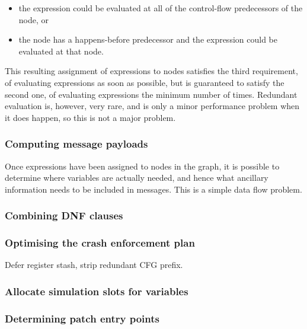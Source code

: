 \documentclass[12pt,a4paper]{book}
\begin{document}
\begin{itemize}
\item the expression could be evaluated at all of the control-flow predecessors of the node, or
\item the node has a happens-before predecessor and the expression could be evaluated at that node.
\end{itemize}

This resulting assignment of expressions to nodes satisfies the third requirement, of evaluating expressions as soon as possible, but is guaranteed to satisfy the second one, of evaluating expressions the minimum number of times.
Redundant evaluation is, however, very rare, and is only a minor performance problem when it does happen, so this is not a major problem.

\subsubsection{Computing message payloads}

Once expressions have been assigned to nodes in the graph, it is possible to determine where variables are actually needed, and hence what ancillary information needs to be included in messages.
This is a simple data flow problem.


\subsubsection{Combining DNF clauses}

\subsubsection{Optimising the crash enforcement plan}
Defer register stash, strip redundant CFG prefix.

\subsubsection{Allocate simulation slots for variables}

\subsubsection{Determining patch entry points}
\end{document}
